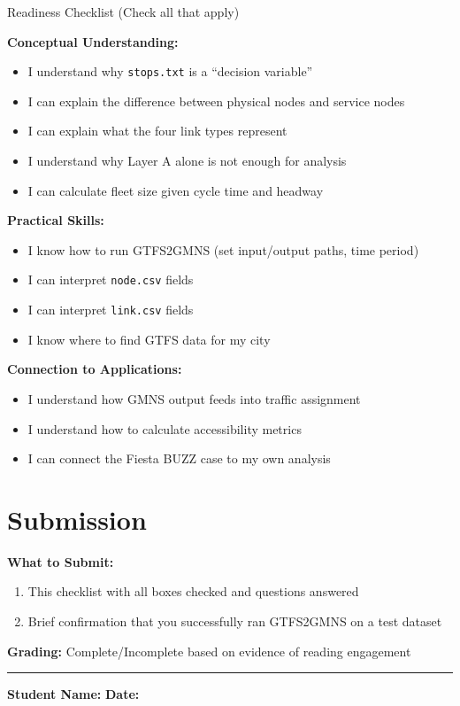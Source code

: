 \documentclass[11pt,letterpaper]{article}
\begin{document}
\begin{questionbox}{Readiness Checklist (Check all that apply)}

\textbf{Conceptual Understanding:}
\begin{itemize}[nosep]
    \item[\checkbox] I understand why \texttt{stops.txt} is a ``decision variable''
    \item[\checkbox] I can explain the difference between physical nodes and service nodes
    \item[\checkbox] I can explain what the four link types represent
    \item[\checkbox] I understand why Layer A alone is not enough for analysis
    \item[\checkbox] I can calculate fleet size given cycle time and headway
\end{itemize}

\vspace{0.3cm}
\textbf{Practical Skills:}
\begin{itemize}[nosep]
    \item[\checkbox] I know how to run GTFS2GMNS (set input/output paths, time period)
    \item[\checkbox] I can interpret \texttt{node.csv} fields
    \item[\checkbox] I can interpret \texttt{link.csv} fields
    \item[\checkbox] I know where to find GTFS data for my city
\end{itemize}

\vspace{0.3cm}
\textbf{Connection to Applications:}
\begin{itemize}[nosep]
    \item[\checkbox] I understand how GMNS output feeds into traffic assignment
    \item[\checkbox] I understand how to calculate accessibility metrics
    \item[\checkbox] I can connect the Fiesta BUZZ case to my own analysis
\end{itemize}

\end{questionbox}

\section{Submission}

\textbf{What to Submit:}
\begin{enumerate}
    \item This checklist with all boxes checked and questions answered
    \item Brief confirmation that you successfully ran GTFS2GMNS on a test dataset
\end{enumerate}

\textbf{Grading:} Complete/Incomplete based on evidence of reading engagement

\vspace{0.5cm}
\hrule
\vspace{0.3cm}
\textbf{Student Name:} \hrulefill \hspace{1cm} \textbf{Date:} \hrulefill
\end{document}
